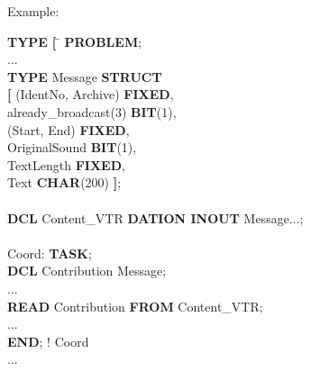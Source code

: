 Example:
\begin{tabbing}
\x \= {\bf TYPE} \= {\bf [} \= \kill
{\bf PROBLEM}; \> \> \> \\
  \> ... \> \> \\
  \> {\bf TYPE} \>         \> Message {\bf STRUCT}\\
  \>            \> {\bf [} \> (IdentNo, Archive) {\bf FIXED},\\
  \>            \>         \> already\_broadcast(3) {\bf BIT}(1),\\
  \>            \>         \> (Start, End) {\bf FIXED},\\
  \>            \>         \> OriginalSound {\bf BIT}(1),\\
  \>            \>         \> TextLength {\bf FIXED},\\
  \>            \>         \> Text {\bf CHAR}(200) {\bf ]};\\
  \>            \>         \> \\
  \> {\bf DCL}  \>         \> Content\_VTR {\bf DATION INOUT} Message...;\\
  \>            \>         \> \\
  \> Coord:     \>         \> {\bf TASK};\\
  \>            \>         \> {\bf DCL} Contribution Message;\\
  \>            \>         \> ...\\
  \>            \>         \> {\bf READ} Contribution {\bf FROM} Content\_VTR;\\
  \>            \>         \> ...\\
  \>            \>         \> {\bf END}; ! Coord\\
  \> ...        \>         \>
\end{tabbing}
